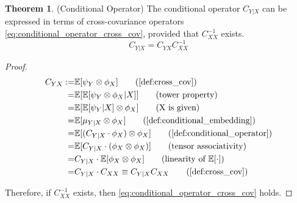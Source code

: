 \documentclass[twoside]{article} \usepackage{aistats2017}
\theoremstyle{definition}
\newtheorem{theorem}{Theorem}[section]
\newcommand{\rv}[1]{{#1}}
\newcommand{\expect}[1]{{\mathbb{E}[#1]}}
\newcommand{\phiX}{\phi_{\rv{X}}}
\newcommand{\psiY}{\psi_{\rv{Y}}}
\newcommand{\Cyx}{C_{\rv{Y} \rv{X}}}
\newcommand{\Cxx}{C_{\rv{X} \rv{X}}}
\newcommand{\Cylx}{C_{\rv{Y} | \rv{X}}}
\begin{document}
		\begin{theorem} \label{thm:conditional_operator}
			(Conditional Operator)
			The conditional operator $\Cylx$ can be expressed in terms of cross-covariance operators \eqref{eq:conditional_operator_cross_cov}, provided that $\Cxx^{-1}$ exists.
			\begin{equation}
				\Cylx = \Cyx \Cxx^{-1}
			\label{eq:conditional_operator_cross_cov}
			\end{equation}
			
			\begin{proof}
				\begin{align*}
				\Cyx :=& \expect{\psiY \otimes \phiX} \tag{\cref{def:cross_cov}}\\
				=& \expect{\expect{\psiY \otimes \phiX | \rv{X}}} \tag{tower property} \\
				=& \expect{\expect{\psiY| \rv{X}} \otimes \phiX} \tag{\rv{X} is given} \\
				=& \expect{\mu_{\rv{Y} | \rv{X}} \otimes \phiX} \tag{\cref{def:conditional_embedding}}\\
				=& \expect{(\Cylx \cdot \phiX) \otimes \phiX} \tag{\cref{def:conditional_operator}} \\
				=& \expect{\Cylx \cdot (\phiX \otimes \phiX)} \tag{tensor associativity} \\
				=& \Cylx \cdot \expect{\phiX \otimes \phiX} \tag{linearity of $\expect{\cdot}$} \\
				=& \Cylx \cdot \Cxx \equiv \Cylx \Cxx \tag{\cref{def:cross_cov}}
				\end{align*}
				
				Therefore, if $\Cxx^{-1}$ exists, then \eqref{eq:conditional_operator_cross_cov} holds.
			\end{proof}
		\end{theorem}
		
\end{document}
